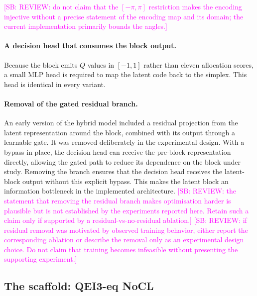 \documentclass[aps,floatfix,superscriptaddress,twocolumn,tightenlines,amsmath,amssymb,nofootinbib,10pt,longbibliography,prl]{revtex4-2}
\newcommand{\sam}[1]{\textcolor{magenta}{[SB: {#1}]}}
\begin{document}
\sam{REVIEW: do not claim that the $[-\pi,\pi]$ restriction makes the encoding injective without a precise statement of the encoding map and its domain; the current implementation primarily bounds the angles.}

\paragraph{A decision head that consumes the block output.}
Because the block emits $Q$ values in $[-1,1]$ rather than eleven allocation scores, a small MLP head is required to map the latent code back to the simplex. This head is identical in every variant.

\paragraph{Removal of the gated residual branch.}
An early version of the hybrid model included a residual projection from the latent representation around the block, combined with its output through a learnable gate. It was removed deliberately in the experimental design. With a bypass in place, the decision head can receive the pre-block representation directly, allowing the gated path to reduce its dependence on the block under study. Removing the branch ensures that the decision head receives the latent-block output without this explicit bypass. This makes the latent block an information bottleneck in the implemented architecture. \sam{REVIEW: the statement that removing the residual branch makes optimisation harder is plausible but is not established by the experiments reported here. Retain such a claim only if supported by a residual-vs-no-residual ablation.}
\sam{REVIEW: if residual removal was motivated by observed training behavior, either report the corresponding ablation or describe the removal only as an experimental design choice. Do not claim that training becomes infeasible without presenting the supporting experiment.}

\subsection{The scaffold: QEI3-eq NoCL}
\label{subsec:arch-nolayer}
\end{document}
